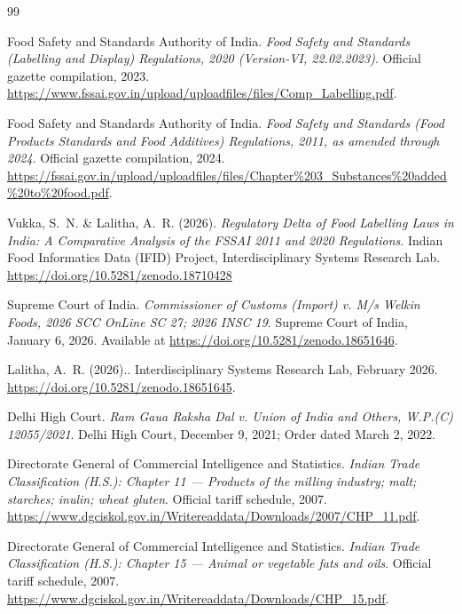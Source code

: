 \documentclass[12pt,a3paper]{article}
\begin{document}
\begin{thebibliography}{99}

{Food Safety and Standards Authority of India}.
\newblock \textit{Food Safety and Standards (Labelling and Display) Regulations, 2020 (Version-VI, 22.02.2023)}.
\newblock Official gazette compilation, 2023.
\newblock \url{https://www.fssai.gov.in/upload/uploadfiles/files/Comp_Labelling.pdf}.

{Food Safety and Standards Authority of India}.
\newblock \textit{Food Safety and Standards (Food Products Standards and Food Additives) Regulations, 2011, as amended through 2024}.
\newblock Official gazette compilation, 2024.
\newblock \url{https://fssai.gov.in/upload/uploadfiles/files/Chapter\%203_Substances\%20added\%20to\%20food.pdf}.

Vukka, S.~N. \& Lalitha, A.~R. (2026).
\textit{Regulatory Delta of Food Labelling Laws in India: A Comparative Analysis of the FSSAI 2011 and 2020 Regulations}. Indian Food Informatics Data (IFID) Project, Interdisciplinary Systems Research Lab.
\url{https://doi.org/10.5281/zenodo.18710428}


{Supreme Court of India}.
\newblock \textit{Commissioner of Customs (Import) v. M/s Welkin Foods, 2026 SCC OnLine SC 27; 2026 INSC 19}.
\newblock Supreme Court of India, January 6, 2026.
\newblock Available at \url{https://doi.org/10.5281/zenodo.18651646}.

Lalitha, A.~R. (2026)..
\newblock Interdisciplinary Systems Research Lab, February 2026.
\newblock \url{https://doi.org/10.5281/zenodo.18651645}.

{Delhi High Court}.
\newblock \textit{Ram Gaua Raksha Dal v. Union of India and Others, W.P.(C) 12055/2021}.
\newblock Delhi High Court, December 9, 2021; Order dated March 2, 2022.

{Directorate General of Commercial Intelligence and Statistics}.
\newblock \textit{Indian Trade Classification (H.S.): Chapter 11 --- Products of the milling industry; malt; starches; inulin; wheat gluten}.
\newblock Official tariff schedule, 2007.
\newblock \url{https://www.dgciskol.gov.in/Writereaddata/Downloads/2007/CHP_11.pdf}.

{Directorate General of Commercial Intelligence and Statistics}.
\newblock \textit{Indian Trade Classification (H.S.): Chapter 15 --- Animal or vegetable fats and oils}.
\newblock Official tariff schedule, 2007.
\newblock \url{https://www.dgciskol.gov.in/Writereaddata/Downloads/CHP_15.pdf}.


\end{thebibliography}
\end{document}
